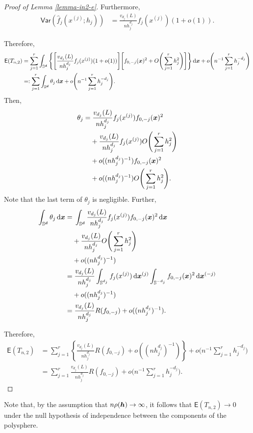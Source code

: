 \documentclass[oneside,11pt]{article}
\begin{document}
\begin{proof}[Proof of Lemma \ref{lemma-in2-e}]
Furthermore,
\begin{align*}
    \mathsf{Var} (\hat{f}_j(x^{(j)};h_j)) &= \frac{v_{d_j}(L)}{n h_j^{d_j}} f_j(x^{(j)}) (1 + o(1)).
\end{align*}

Therefore,
\begin{align*}
    \mathsf{E} (T_{n,2}) &= \sum_{j=1}^{r} \int_{\mathbb{S}^{\boldsymbol{d}}} \Bigg\{ \Bigg[ \frac{v_{d_j}(L)}{n h_j^{d_j}} f_j(x^{(j)})(1 + o(1)) \Bigg] \Bigg[ f_{0,-j}(\boldsymbol{x})^2+ O \Bigg( \sum_{j=1}^{r} h_j^2 \Bigg) \Bigg] \Bigg\} \,\mathrm{d} \boldsymbol{x} + o \Bigg( n^{-1} \sum_{j=1}^{r} h_j^{-d_j} \Bigg)\\
    &=: \sum_{j=1}^{r} \int_{\mathbb{S}^{\boldsymbol{d}}} \theta_j \,\mathrm{d} \boldsymbol{x} + o \Bigg( n^{-1} \sum_{j=1}^{r} h_j^{-d_j} \Bigg).
\end{align*}
Then,
\begin{align*}
    \theta_j =&\; \frac{v_{d_j}(L)}{n h_j^{d_j}} f_j(x^{(j)}) f_{0,-j}(\boldsymbol{x})^2\\
    &+ \frac{v_{d_j}(L)}{n h_j^{d_j}} f_j(x^{(j)}) O \Bigg( \sum_{j=1}^{r} h_j^2 \Bigg) \\
    &+ o((n h_j^{d_j})^{-1}) f_{0,-j}(\boldsymbol{x})^2\\
    &+ o((n h_j^{d_j})^{-1}) O \Bigg( \sum_{j=1}^{r} h_j^2 \Bigg).
\end{align*}
Note that the last term of $\theta_j$ is negligible. Further,
\begin{align*}
    \int_{\mathbb{S}^{\boldsymbol{d}}} \theta_j \,\mathrm{d} \boldsymbol{x} =&\; \int_{\mathbb{S}^{\boldsymbol{d}}} \frac{v_{d_j}(L)}{n h_j^{d_j}} f_j(x^{(j)}) f_{0,-j}(\boldsymbol{x})^2 \,\mathrm{d} \boldsymbol{x} \\
    &+ \frac{v_{d_j}(L)}{n h_j^{d_j}} O \Bigg( \sum_{j=1}^{r} h_j^2 \Bigg) \\
    &+ o((n h_j^{d_j})^{-1})\\
    =&\; \frac{v_{d_j}(L)}{n h_j^{d_j}} \int_{\mathbb{S}^{d_j}} f_j(x^{(j)})\,\mathrm{d} \boldsymbol{x}^{(j)}  \int_{\mathbb{S}^{-d_j}} f_{0,-j}(\boldsymbol{x})^2 \,\mathrm{d} \boldsymbol{x}^{(-j)} \\
    &+ o((n h_j^{d_j})^{-1})\\
    =&\; \frac{v_{d_j}(L)}{n h_j^{d_j}}  R(f_{0,-j})+ o((n h_j^{d_j})^{-1}).
\end{align*}

Therefore,
\begin{align*}
    \mathsf{E} (T_{n,2}) &= \sum_{j=1}^{r} \left\{\frac{v_{d_j}(L)}{n h_j^{d_j}}  R(f_{0,-j})+ o((n h_j^{d_j})^{-1})\right\}+ o \Bigg( n^{-1} \sum_{j=1}^{r} h_j^{-d_j} \Bigg)\\
    &=\sum_{j=1}^{r} \frac{v_{d_j}(L)}{n h_j^{d_j}}  R(f_{0,-j})+ o \Bigg( n^{-1} \sum_{j=1}^{r} h_j^{-d_j} \Bigg).
\end{align*}
\end{proof}
Note that, by the assumption that $n \rho({\boldsymbol{h}}) \to \infty$, it follows that $\mathsf{E} (T_{n,2}) \to 0$ under the null hypothesis of independence between the components of the polysphere.
\end{document}
